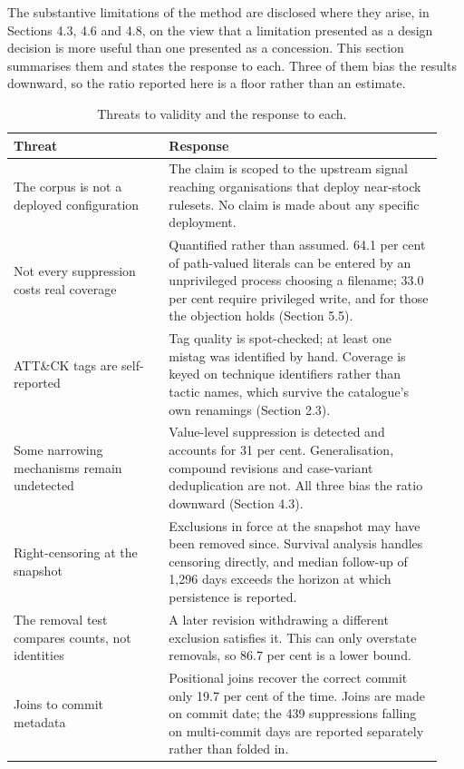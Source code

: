 The substantive limitations of the method are disclosed where they arise, in Sections 4.3, 4.6 and 4.8, on the view that a limitation presented as a design decision is more useful than one presented as a concession. This section summarises them and states the response to each. Three of them bias the results downward, so the ratio reported here is a floor rather than an estimate.

\begin{table}[htbp]
\centering
\small
\caption{Threats to validity and the response to each.}
\label{table:3}
\begin{tabular}{@{}p{0.34\linewidth}p{0.60\linewidth}@{}}
\toprule
Threat & Response \\
\midrule
The corpus is not a deployed configuration & The claim is scoped to the upstream signal reaching organisations that deploy near-stock rulesets. No claim is made about any specific deployment. \\
Not every suppression costs real coverage & Quantified rather than assumed. 64.1 per cent of path-valued literals can be entered by an unprivileged process choosing a filename; 33.0 per cent require privileged write, and for those the objection holds (Section 5.5). \\
ATT\&CK tags are self-reported & Tag quality is spot-checked; at least one mistag was identified by hand. Coverage is keyed on technique identifiers rather than tactic names, which survive the catalogue's own renamings (Section 2.3). \\
Some narrowing mechanisms remain undetected & Value-level suppression is detected and accounts for 31 per cent. Generalisation, compound revisions and case-variant deduplication are not. All three bias the ratio downward (Section 4.3). \\
Right-censoring at the snapshot & Exclusions in force at the snapshot may have been removed since. Survival analysis handles censoring directly, and median follow-up of 1,296 days exceeds the horizon at which persistence is reported. \\
The removal test compares counts, not identities & A later revision withdrawing a different exclusion satisfies it. This can only overstate removals, so 86.7 per cent is a lower bound. \\
Joins to commit metadata & Positional joins recover the correct commit only 19.7 per cent of the time. Joins are made on commit date; the 439 suppressions falling on multi-commit days are reported separately rather than folded in. \\

\end{tabular}
\end{table}
